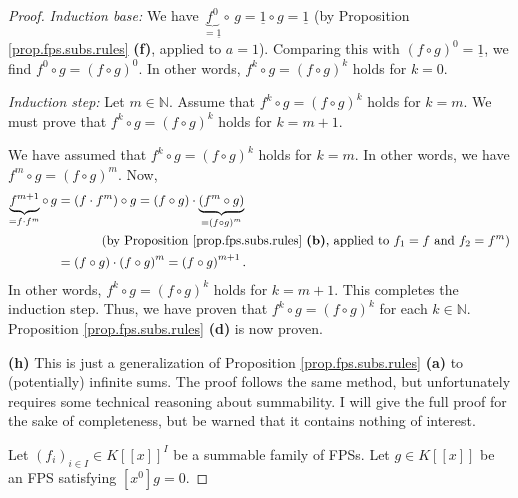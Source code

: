\begin{proof}
\textit{Induction base:} We have $\underbrace{f^{0}}_{=\underline{1}}%
\circ\,g=\underline{1}\circ g=\underline{1}$ (by Proposition
\ref{prop.fps.subs.rules} \textbf{(f)}, applied to $a=1$). Comparing this with
$\left(  f\circ g\right)  ^{0}=\underline{1}$, we find $f^{0}\circ g=\left(
f\circ g\right)  ^{0}$. In other words, $f^{k}\circ g=\left(  f\circ g\right)
^{k}$ holds for $k=0$.

\textit{Induction step:} Let $m\in\mathbb{N}$. Assume that $f^{k}\circ
g=\left(  f\circ g\right)  ^{k}$ holds for $k=m$. We must prove that
$f^{k}\circ g=\left(  f\circ g\right)  ^{k}$ holds for $k=m+1$.

We have assumed that $f^{k}\circ g=\left(  f\circ g\right)  ^{k}$ holds for
$k=m$. In other words, we have $f^{m}\circ g=\left(  f\circ g\right)  ^{m}$.
Now,%
\begin{align*}
\underbrace{f^{m+1}}_{=f\cdot f^{m}}\circ\,g  &  =\left(  f\cdot f^{m}\right)
\circ g=\left(  f\circ g\right)  \cdot\underbrace{\left(  f^{m}\circ g\right)
}_{=\left(  f\circ g\right)  ^{m}}\\
&  \ \ \ \ \ \ \ \ \ \ \left(  \text{by Proposition \ref{prop.fps.subs.rules}
\textbf{(b)}, applied to }f_{1}=f\text{ and }f_{2}=f^{m}\right) \\
&  =\left(  f\circ g\right)  \cdot\left(  f\circ g\right)  ^{m}=\left(  f\circ
g\right)  ^{m+1}.
\end{align*}
In other words, $f^{k}\circ g=\left(  f\circ g\right)  ^{k}$ holds for
$k=m+1$. This completes the induction step. Thus, we have proven that
$f^{k}\circ g=\left(  f\circ g\right)  ^{k}$ for each $k\in\mathbb{N}$.
Proposition \ref{prop.fps.subs.rules} \textbf{(d)} is now proven.

\bigskip

\textbf{(h)} This is just a generalization of Proposition
\ref{prop.fps.subs.rules} \textbf{(a)} to (potentially) infinite sums. The
proof follows the same method, but unfortunately requires some technical
reasoning about summability. I will give the full proof for the sake of
completeness, but be warned that it contains nothing of interest.

Let $\left(  f_{i}\right)  _{i\in I}\in K\left[  \left[  x\right]  \right]
^{I}$ be a summable family of FPSs. Let $g\in K\left[  \left[  x\right]
\right]  $ be an FPS satisfying $\left[  x^{0}\right]  g=0$.


\end{proof}
